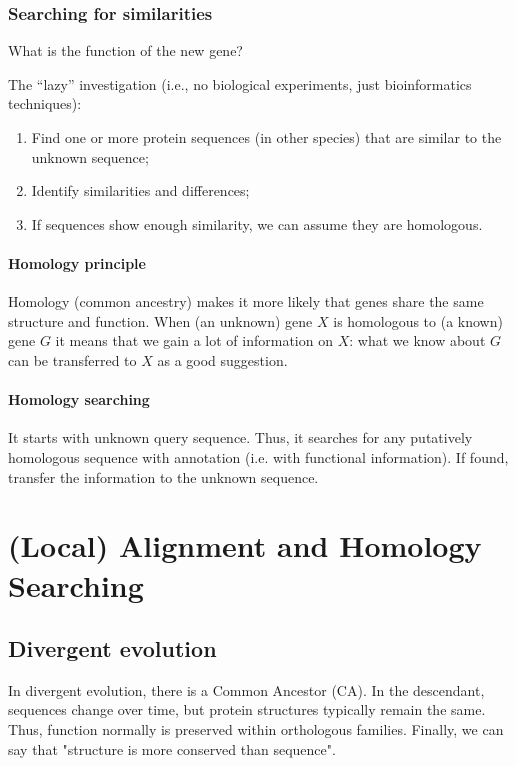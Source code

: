 \subsection{Searching for similarities}

What is the function of the new gene?

The “lazy” investigation (i.e., no biological experiments, just bioinformatics 
techniques):

\begin{enumerate}
\item Find one or more protein sequences (in other species) that are similar to 
the unknown sequence;
\item Identify similarities and differences;
\item If sequences show enough similarity, we can assume they are homologous.
\end{enumerate}

\subsubsection{Homology principle}

Homology (common ancestry) makes it more likely that genes share the same 
structure and function.
When (an unknown) gene $X$ is homologous to (a known) gene $G$ it means that we 
gain a lot of information on $X$: what we know about $G$ can be transferred to $X$ 
as a good suggestion.

\subsubsection{Homology searching}

It starts with unknown query sequence. Thus, it searches for any putatively 
homologous sequence with annotation (i.e. with functional information). 
If found, transfer the information to the unknown sequence.

\chapter{(Local) Alignment and Homology Searching}

\section{Divergent evolution}

In divergent evolution, there is a Common Ancestor (CA). In the descendant, 
sequences change over time, but protein structures typically remain the same.
Thus, function normally is preserved within orthologous families.
Finally, we can say that "structure is more conserved than sequence".

